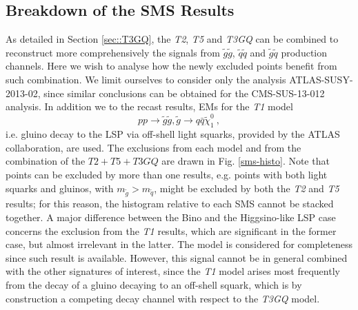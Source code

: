 \documentclass[preprint,number,sort&compress,twocolumn,3p]{elsstyarticle}
\begin{document}
\subsection{Breakdown of the SMS Results}
As detailed in Section \ref{sec::T3GQ}, the \textit{T2}, \textit{T5} and \textit{T3GQ} can be combined to reconstruct more comprehensively the signals from $\tilde g \tilde g$, $\tilde q \tilde q$ and $\tilde g \tilde q$ production channels. Here we wish to analyse how the newly excluded points benefit from such combination. We limit ourselves to consider only the analysis ATLAS-SUSY-2013-02, since similar conclusions can be obtained for the CMS-SUS-13-012 analysis. In addition we to the recast results, EMs for the \textit{T1} model 
\begin{equation}
p p \rightarrow \tilde g \tilde g , \tilde g \rightarrow q \bar q \tilde \chi_1 ^0 \ , 
\end{equation}
i.e. gluino decay to the LSP via off-shell light squarks, provided by the ATLAS collaboration, are used. The exclusions from each model and from the combination of the $T2+T5+T3GQ$ are drawn in Fig. \ref{sms-histo}. 
%
%
%
Note that points can be excluded by more than one results, e.g. points with both light squarks and gluinos, with $m_{\tilde g} > m_{\tilde q}$, might be excluded by both the \textit{T2} and \textit{T5} results; for this reason, the histogram relative to each SMS cannot be stacked together. A major difference between the Bino and the Higgsino-like LSP case concerns the exclusion from the \textit{T1} results, which are significant in the former case, but almost irrelevant in the latter. The model is considered for completeness since such result is available. However, this signal cannot be in general combined with the other signatures of interest, since the \textit{T1} model arises most frequently from the decay of a gluino decaying to an off-shell squark, which is by construction a competing decay channel with respect to the \textit{T3GQ} model. 
\end{document}
